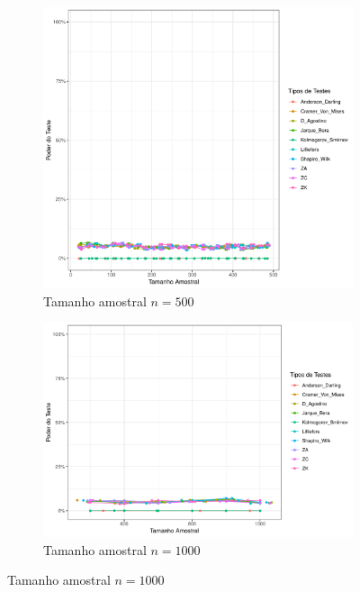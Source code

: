 \documentclass[a4paper,11pt]{article} %
\begin{document}
\begin{figure}[H]
    \vspace{0.5cm} %
    \begin{subfigure}[b]{0.45\textwidth}
        \centering
        \includegraphics[width=\textwidth]{Distribuição Normal/Poder do Teste/poder_teste_normal_500.pdf}
        \caption{Tamanho amostral \(n = 500\)}
        \label{fig:normal_poder_500}
    \end{subfigure}
    \hfill
    \begin{subfigure}[b]{0.45\textwidth}
        \centering
        \includegraphics[width=\textwidth]{Distribuição Normal/Poder do Teste/poder_teste_normal_1000.pdf}
        \caption{Tamanho amostral \(n = 1000\)}
        \label{fig:normal_poder_1000}
    \end{subfigure}
\end{figure}
\end{document}
